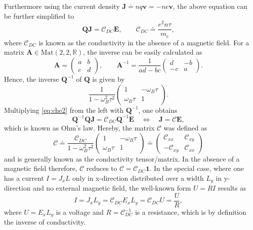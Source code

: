\documentclass{report}
\numberwithin{tm}{section}
\newcommand\matr[1]{\ensuremath{\boldsymbol{\mathbf{#1}}}}
\newcommand\vect[1]{\ensuremath{\bm{#1}}}
\begin{document}
\begin{equation}
	\end{equation} Furthermore using the current density $\vect{J} \doteq nq\vect{v} = -ne\vect{v}$, the above equation can be further simplified to \begin{equation}\label{eq:che2}\matr{Q}\vect{J} = \mathcal{C}_{DC}\vect{E}, \qquad \mathcal{C}_{DC} \doteq \frac{e^2n\tau}{m_e}, \end{equation} where $\mathcal{C}_{DC}$ is known as the conductivity in the absence of a magnetic field. For a matrix $\matr{A} \in \text{Mat}(2,2,\mathbb{R})$, the inverse can be easily calculated as \begin{equation}
		\matr{A} = \begin{pmatrix}
			a & b \\ c & d
		\end{pmatrix}, \qquad \matr{A}^{-1} = \frac{1}{ad-bc}\begin{pmatrix}
		d & -b \\ -c & a
		\end{pmatrix}.
	\end{equation} Hence, the inverse $\matr{Q}^{-1}$ of $\matr{Q}$ is given by \begin{equation}
	\frac{1}{1-\omega_B^2\tau^2}\begin{pmatrix}
		1 & -\omega_B\tau \\ \omega_B\tau & 1
	\end{pmatrix}.
	\end{equation} Multiplying \cref{eq:che2} from the left with $\matr{Q}^{-1}$, one obtains 
	\begin{equation}
		\matr{Q}^{-1}\matr{Q}\vect{J} = \mathcal{C}_{DC}\matr{Q}^{-1}\vect{E} \quad \Leftrightarrow \quad \vect{J} = \matr{\mathcal{C}}\vect{E},
	\end{equation} which is known as Ohm's law. Hereby, the matrix $\matr{\mathcal{C}}$ was defined as \begin{equation}\label{eq:conductivitytensor}
	\matr{\mathcal{C}} \doteq \frac{\mathcal{C}_{DC}}{1-\omega_B^2\tau^2}\begin{pmatrix}
		1 & -\omega_B\tau \\ \omega_B\tau & 1
	\end{pmatrix} \doteq \begin{pmatrix}
	\mathcal{C}_{xx} & \mathcal{C}_{xy} \\ -\mathcal{C}_{xy} & \mathcal{C}_{xx}
	\end{pmatrix}
	\end{equation} and is generally known as the conductivity tensor/matrix. In the absence of a magnetic field therefore, $\matr{\mathcal{C}}$ reduces to $\matr{\mathcal{C}} = \mathcal{C}_{DC}\matr{1}$. In the special case, where one has a current $I = J_x L$ only in x-direction distributed over a width $L_y$ in y-direction and no external magnetic field, the well-known form $U = R I$ results as \begin{equation}
	I = J_x L_y = \mathcal{C}_{DC}E_x L_y = \mathcal{C}_{DC}U = \frac{U}{R},
	\end{equation} where $U = E_x L_y$ is a voltage and $R = \mathcal{C}_{DC}^{-1}$ is a resistance, which is by definition the inverse of conductivity.
	
\end{document}

